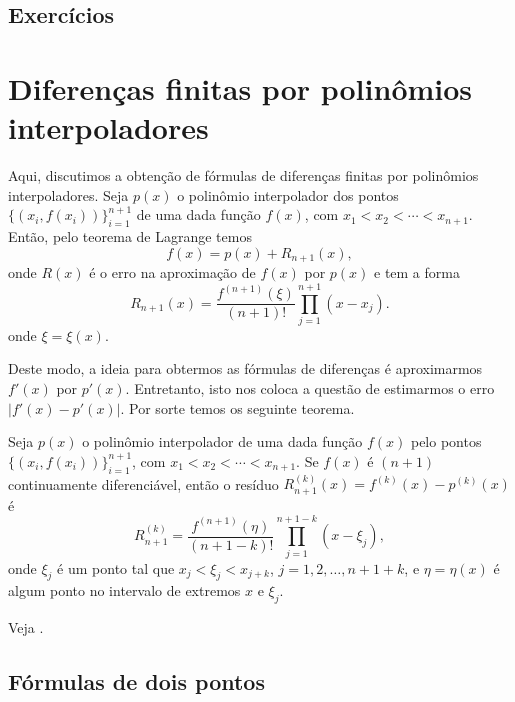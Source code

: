 \subsection*{Exercícios}

\emconstrucao


\section{Diferenças finitas por polinômios interpoladores}\label{cap_deriv_sec_df_pi}

Aqui, discutimos a obtenção de fórmulas de diferenças finitas por polinômios interpoladores. Seja $p(x)$ o polinômio interpolador dos pontos $\{(x_i,f(x_i))\}_{i=1}^{n+1}$ de uma dada função $f(x)$, com $x_1 < x_2 < \cdots < x_{n+1}$. Então, pelo teorema de Lagrange temos
\begin{equation}
  f(x) = p(x) + R_{n+1}(x),
\end{equation}
onde $R(x)$ é o erro na aproximação de $f(x)$ por $p(x)$ e tem a forma
\begin{equation}
  R_{n+1}(x) = \frac{f^{(n+1)}(\xi)}{(n+1)!}\prod_{j=1}^{n+1}(x-x_j).
\end{equation}
onde $\xi = \xi(x)$.

Deste modo, a ideia para obtermos as fórmulas de diferenças é aproximarmos $f'(x)$ por $p'(x)$. Entretanto, isto nos coloca a questão de estimarmos o erro $|f'(x) - p'(x)|$. Por sorte temos os seguinte teorema.

\begin{teo}\label{teo:erro_de_Lagrange_deriv}
  Seja $p(x)$ o polinômio interpolador de uma dada função $f(x)$ pelo pontos $\{(x_i, f(x_i))\}_{i=1}^{n+1}$, com $x_1<x_2<\cdots<x_{n+1}$. Se $f(x)$ é $(n+1)$ continuamente diferenciável, então o resíduo $R_{n+1}^{(k)}(x) = f^{(k)}(x) - p^{(k)}(x)$ é
  \begin{equation}
    R_{n+1}^{(k)} = \frac{f^{(n+1)}(\eta) }{(n+1-k)!}\prod_{j=1}^{n+1-k}(x-\xi_j),
  \end{equation}
onde $\xi_j$ é um ponto tal que $x_j < \xi_j < x_{j+k}$, $j=1, 2, \dotsc, n+1+k$, e $\eta = \eta(x)$ é algum ponto no intervalo de extremos $x$ e $\xi_j$. 
\end{teo}
\begin{dem}
  Veja \cite[Ch.6, Sec.5]{Isaacson1994a}.
\end{dem}

\subsection{Fórmulas de dois pontos}

